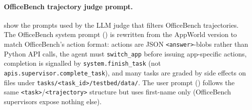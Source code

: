 \paragraph{OfficeBench trajectory judge prompt.}
 show the prompts used by the LLM judge that filters OfficeBench trajectories. The OfficeBench system prompt () is rewritten from the AppWorld version to match OfficeBench's action format: actions are JSON \texttt{<answer>}-blobs rather than Python API calls, the agent must \texttt{switch\_app} before issuing app-specific actions, completion is signalled by \texttt{system.finish\_task} (not \texttt{apis.supervisor.complete\_task}), and many tasks are graded by side effects on files under \texttt{tasks/<task\_id>/testbed/data/}. The user prompt () follows the same \texttt{<task>}/\texttt{<trajectory>} structure but uses first-name only (OfficeBench supervisors expose nothing else).


